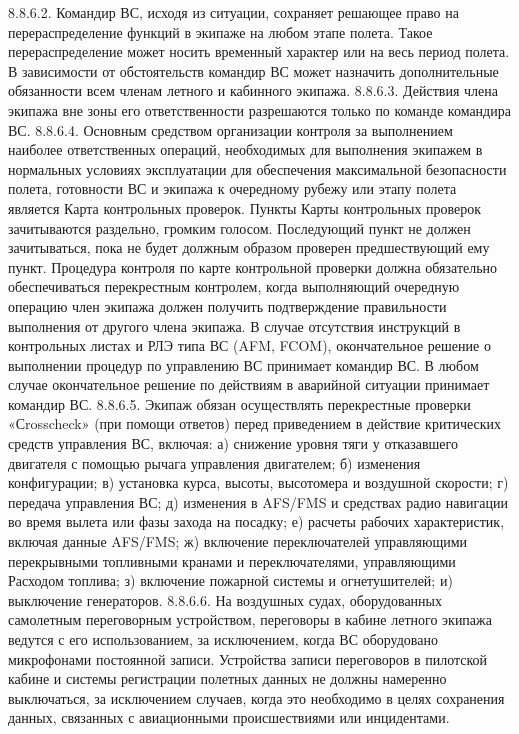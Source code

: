 8.8.6.2. Командир ВС, исходя из ситуации, сохраняет решающее право на перераспределение функций в экипаже на любом этапе полета. Такое перераспределение может носить временный характер или на весь период полета.
В зависимости от обстоятельств командир ВС может назначить дополнительные обязанности всем членам летного и кабинного экипажа. 
8.8.6.3. Действия члена экипажа вне зоны его ответственности разрешаются только по команде командира ВС.
8.8.6.4. Основным средством организации контроля за выполнением наиболее ответственных операций, необходимых для выполнения экипажем в нормальных условиях эксплуатации для обеспечения максимальной безопасности полета, готовности ВС и экипажа к очередному рубежу или этапу полета является Карта контрольных проверок.
Пункты Карты контрольных проверок зачитываются раздельно, громким голосом.
Последующий пункт не должен зачитываться, пока не будет должным образом проверен предшествующий ему пункт. 
Процедура контроля по карте контрольной проверки должна обязательно обеспечиваться перекрестным контролем, когда выполняющий очередную операцию член экипажа должен получить подтверждение правильности выполнения от другого члена экипажа.
В случае отсутствия инструкций в контрольных листах и РЛЭ типа ВС (AFM, FCOM), окончательное решение о выполнении процедур по управлению ВС принимает командир ВС.
В любом случае окончательное решение по действиям в аварийной ситуации принимает командир ВС.
8.8.6.5. Экипаж обязан осуществлять перекрестные проверки «Сrosscheck» (при помощи ответов) перед приведением в действие критических средств управления ВС, включая:
а)	снижение уровня тяги у отказавшего двигателя с помощью рычага управления двигателем;
б)	изменения конфигурации;
в)	установка курса, высоты, высотомера и воздушной скорости;
г)	передача управления ВС;
д)	изменения в AFS/FMS и средствах радио навигации во время вылета или фазы захода на посадку;
е)	расчеты рабочих характеристик, включая данные AFS/FMS;
ж)	включение переключателей управляющими перекрывными топливными кранами и переключателями, управляющими Расходом топлива;
з)	включение пожарной системы и огнетушителей;
и)	выключение генераторов.
8.8.6.6. На воздушных судах, оборудованных самолетным переговорным устройством, переговоры в кабине летного экипажа ведутся с его использованием, за исключением, когда ВС оборудовано микрофонами постоянной записи. Устройства записи переговоров в пилотской кабине и системы регистрации полетных данных не должны намеренно выключаться, за исключением случаев, когда это необходимо в целях сохранения данных, связанных с авиационными происшествиями или инцидентами.
